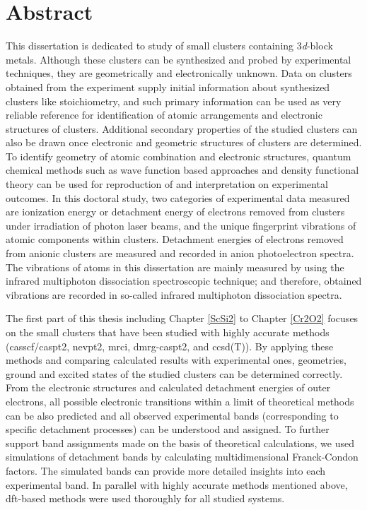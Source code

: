 
\chapter{Abstract}                                 \label{ch:abstract}


This dissertation is dedicated to study of small clusters containing 3\textit{d}-block metals. Although these clusters can be synthesized and probed by experimental techniques, they are geometrically and electronically unknown. Data on clusters obtained from the experiment supply initial  information about synthesized clusters like stoichiometry, and such primary information can be used as very reliable reference for identification of atomic arrangements and electronic structures of clusters. Additional secondary properties of the studied clusters can also be drawn once electronic and geometric structures of clusters are determined. To identify geometry of atomic combination and electronic structures, quantum chemical methods such as wave function based approaches and density functional theory can be used for reproduction of and interpretation on experimental outcomes. In this doctoral study, two categories of experimental data measured are ionization energy or detachment energy of electrons removed from clusters under irradiation of photon laser beams, and the unique fingerprint vibrations of atomic components within clusters. Detachment energies of electrons removed from anionic clusters are measured and recorded in anion photoelectron spectra. The vibrations of atoms in this dissertation are mainly measured by using the infrared multiphoton dissociation spectroscopic technique; and therefore, obtained vibrations are recorded in so-called infrared multiphoton dissociation spectra. 


The first part of this thesis including Chapter \ref{ScSi2} to Chapter \ref{Cr2O2} focuses on the small clusters that have been studied with highly accurate methods (\acrshort{casscf}/\acrshort{caspt2}, \acrshort{nevpt2}, \acrshort{mrci}, \acrshort{dmrg}-\acrshort{caspt2}, and \acrshort{ccsd}(T)). By applying these methods and comparing calculated results with experimental ones, geometries, ground and excited states of the studied clusters can be determined correctly. From the electronic structures and calculated detachment energies of outer electrons, all possible electronic transitions within a limit of theoretical methods can be also predicted and all observed experimental bands (corresponding to specific detachment processes) can be understood and assigned. To further support band assignments made on the basis of theoretical calculations, we used simulations of detachment bands by calculating multidimensional Franck-Condon factors. The simulated bands can provide more detailed insights into each experimental band. In parallel with highly accurate methods mentioned above, \acrshort{dft}-based methods were used thoroughly for all studied systems. 




